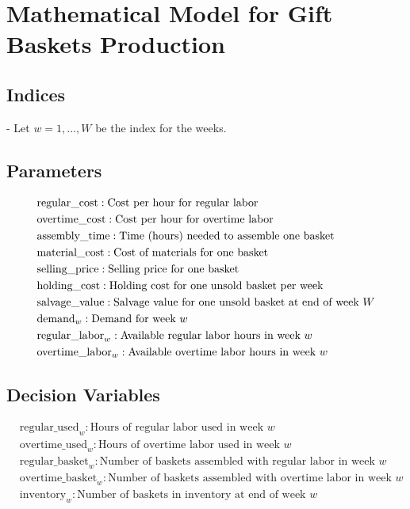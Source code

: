 \documentclass{article}
\begin{document}
\section*{Mathematical Model for Gift Baskets Production}

\subsection*{Indices}
- Let \( w = 1, \ldots, W \) be the index for the weeks.

\subsection*{Parameters}
\begin{align*}
    & \text{regular\_cost}: \text{Cost per hour for regular labor} \\
    & \text{overtime\_cost}: \text{Cost per hour for overtime labor} \\
    & \text{assembly\_time}: \text{Time (hours) needed to assemble one basket} \\
    & \text{material\_cost}: \text{Cost of materials for one basket} \\
    & \text{selling\_price}: \text{Selling price for one basket} \\
    & \text{holding\_cost}: \text{Holding cost for one unsold basket per week} \\
    & \text{salvage\_value}: \text{Salvage value for one unsold basket at end of week \( W \)} \\
    & \text{demand}_w: \text{Demand for week } w \\
    & \text{regular\_labor}_w: \text{Available regular labor hours in week } w \\
    & \text{overtime\_labor}_w: \text{Available overtime labor hours in week } w \\
\end{align*}

\subsection*{Decision Variables}
\begin{align*}
    & \text{regular\_used}_w: \text{Hours of regular labor used in week } w \\
    & \text{overtime\_used}_w: \text{Hours of overtime labor used in week } w \\
    & \text{regular\_basket}_w: \text{Number of baskets assembled with regular labor in week } w \\
    & \text{overtime\_basket}_w: \text{Number of baskets assembled with overtime labor in week } w \\
    & \text{inventory}_w: \text{Number of baskets in inventory at end of week } w \\
\end{align*}
\end{document}
